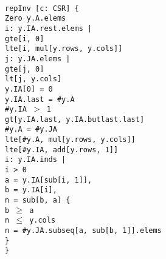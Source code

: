 \begin{myquote}\small{\texttt{\\
\Bpred repInv [c: CSR] \{\\
\TA Zero \Bnot \Bin y.A.elems\\
\TA \Ball i: y.IA.rest.elems |\\
\TB gte[i, 0] \Band\\
\TB lte[i, mul[y.rows, y.cols]]\\
\TA \Ball j: y.JA.elems |\\
\TB gte[j, 0] \Band\\
\TB lt[j, y.cols]\\
\TA y.IA[0] = 0\\
\TA y.IA.last = \#y.A\\
\TA \#y.IA $>$ 1 \Bimplies\\
\TC gt[y.IA.last, y.IA.butlast.last]\\
\TA \#y.A = \#y.JA\\
\TA lte[\#y.A, mul[y.rows, y.cols]]\\
\TA lte[\#y.IA, add[y.rows, 1]]\\
\TA \Ball i: y.IA.inds |\\
\TB i > 0 \Bimplies\\
\TC \Blet a = y.IA[sub[i, 1]],\\
\TC       b = y.IA[i],\\
\TC       n = sub[b, a] \{\\
\TD   b $\geq$ a\\
\TD   n $\leq$ y.cols\\
\TD   n = \#y.JA.subseq[a, sub[b, 1]].elems\\
\TC \}\\
\}
}}
\end{myquote}

